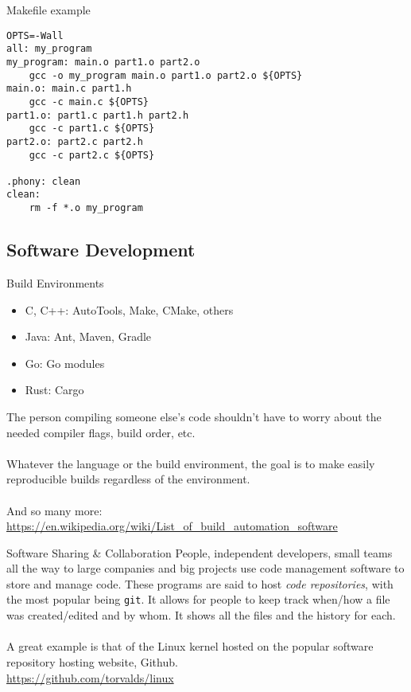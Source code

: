\documentclass[graphics]{beamer}
\begin{document}
\begin{frame}[fragile]{Makefile example}
\begin{verbatim}
OPTS=-Wall
all: my_program
my_program: main.o part1.o part2.o
    gcc -o my_program main.o part1.o part2.o ${OPTS}
main.o: main.c part1.h
    gcc -c main.c ${OPTS}
part1.o: part1.c part1.h part2.h
    gcc -c part1.c ${OPTS}
part2.o: part2.c part2.h
    gcc -c part2.c ${OPTS}

.phony: clean
clean:
    rm -f *.o my_program
\end{verbatim}
\end{frame}

\subsection{Software Development}
\begin{frame}{Build Environments}
    \begin{itemize}
        \item C, C++: AutoTools, Make, CMake, others
        \item Java: Ant, Maven, Gradle
        \item Go: Go modules
        \item Rust: Cargo
    \end{itemize}
    The person compiling someone else’s code shouldn't have to worry about the needed compiler flags, build order, etc.
    \\ ~~ \\
    Whatever the language or the build environment, the goal is to make easily reproducible builds regardless of the environment.
    \\ ~~ \\
    \footnotesize
    And so many more: \url{https://en.wikipedia.org/wiki/List\_of\_build\_automation\_software}
\end{frame}

\begin{frame}{Software Sharing \& Collaboration}
    People, independent developers, small teams all the way to large companies and big projects use code management software to store and manage code.  These programs are said to host \textit{code repositories}, with the most popular being \texttt{git}. It allows for people to keep track when/how a file was created/edited and by whom. It shows all the files and the history for each.
    \\ ~~ \\
    A great example is that of the Linux kernel hosted on the popular software repository hosting website, Github. \\
    \url{https://github.com/torvalds/linux}
\end{frame}
\end{document}
